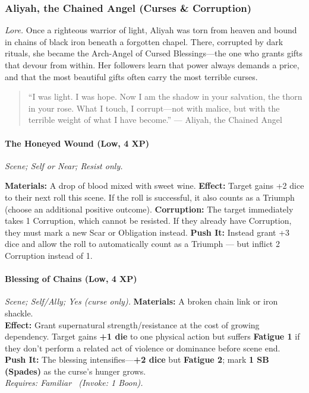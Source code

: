 \subsubsection{Aliyah, the Chained Angel (Curses \& Corruption)}
\textit{Lore.} Once a righteous warrior of light, Aliyah was torn from heaven and bound in chains of black iron beneath a forgotten chapel. There, corrupted by dark rituals, she became the Arch-Angel of Cursed Blessings—the one who grants gifts that devour from within. Her followers learn that power always demands a price, and that the most beautiful gifts often carry the most terrible curses.

\begin{quote}
``I was light. I was hope. Now I am the shadow in your salvation, the thorn in your rose. What I touch, I corrupt—not with malice, but with the terrible weight of what I have become.'' — Aliyah, the Chained Angel
\end{quote}

\paragraph{The Honeyed Wound (Low, 4 XP)}  
\emph{Scene; Self or Near; Resist only.}  

\textbf{Materials:} A drop of blood mixed with sweet wine.  
\textbf{Effect:} Target gains +2 dice to their next roll this scene. If the roll is successful, it also counts as a Triumph (choose an additional positive outcome).  
\textbf{Corruption:} The target immediately takes 1 Corruption, which cannot be resisted. If they already have Corruption, they must mark a new Scar or Obligation instead.  
\textbf{Push It:} Instead grant +3 dice and allow the roll to automatically count as a Triumph — but inflict 2 Corruption instead of 1.  

\paragraph{Blessing of Chains (Low, 4 XP)} \emph{Scene; Self/Ally; Yes (curse only).}
\textbf{Materials:} A broken chain link or iron shackle.\\
\textbf{Effect:} Grant supernatural strength/resistance at the cost of growing dependency. Target gains \textbf{+1 die} to one physical action but suffers \textbf{Fatigue 1} if they don't perform a related act of violence or dominance before scene end.\\
\textbf{Push It:} The blessing intensifies—\textbf{+2 dice} but \textbf{Fatigue 2}; mark \textbf{1 SB (Spades)} as the curse's hunger grows.\\
\emph{Requires: Familiar \ (\textit{Invoke:} 1 Boon).}

